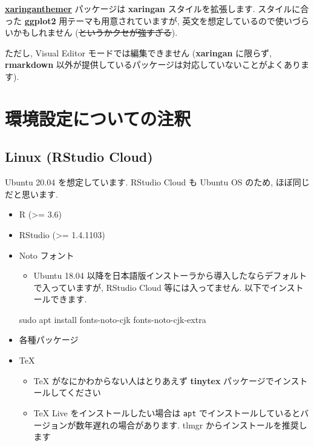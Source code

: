 \documentclass[
]{ltjsarticle}
\newenvironment{Shaded}{\begin{snugshade}}{\end{snugshade}}
\newcommand{\FunctionTok}[1]{\textcolor[rgb]{0.00,0.00,0.00}{#1}}
\newcommand{\NormalTok}[1]{#1}
\providecommand{\tightlist}{%
  \setlength{\itemsep}{0pt}\setlength{\parskip}{0pt}}
\begin{document}
\href{https://pkg.garrickadenbuie.com/xaringanthemer/}{\textbf{xaringanthemer}} パッケージは \textbf{xaringan} スタイルを拡張します. スタイルに合った \textbf{ggplot2} 用テーマも用意されていますが, 英文を想定しているので使いづらいかもしれません (\sout{というかクセが強すぎる}).

ただし, Visual Editor モードでは編集できません (\textbf{xaringan} に限らず, \textbf{rmarkdown} 以外が提供しているパッケージは対応していないことがよくあります).

\hypertarget{setup-notes}{%
\section{環境設定についての注釈}\label{setup-notes}}

\hypertarget{linux-rstudio-cloud}{%
\subsection{Linux (RStudio Cloud)}\label{linux-rstudio-cloud}}

Ubuntu 20.04 を想定しています. RStudio Cloud も Ubuntu OS のため, ほぼ同じだと思います.

\begin{itemize}
\tightlist
\item
  R (\textgreater= 3.6)
\item
  RStudio (\textgreater= 1.4.1103)
\item
  Noto フォント

  \begin{itemize}
  \tightlist
  \item
    Ubuntu 18.04 以降を日本語版インストーラから導入したならデフォルトで入っていますが, RStudio Cloud 等には入ってません. 以下でインストールできます.
  \end{itemize}

\begin{Shaded}
\begin{Highlighting}[]
\FunctionTok{sudo}\NormalTok{ apt install fonts{-}noto{-}cjk fonts{-}noto{-}cjk{-}extra}
\end{Highlighting}
\end{Shaded}
\item
  各種パッケージ
\item
  TeX

  \begin{itemize}
  \tightlist
  \item
    TeX がなにかわからない人はとりあえず \textbf{tinytex} パッケージでインストールしてください
  \item
    TeX Live をインストールしたい場合は \texttt{apt} でインストールしているとバージョンが数年遅れの場合があります. tlmgr からインストールを推奨します
  \end{itemize}
\end{itemize}
\end{document}
